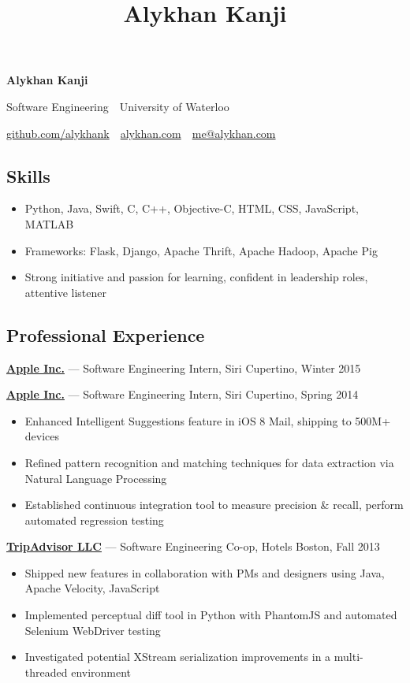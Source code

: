 \documentclass[11pt,letterpaper]{article}
\title{Alykhan Kanji}
\begin{document}
\begin{center}
  {\Huge \textbf{Alykhan Kanji}}

  {\large
    Software Engineering\ \textperiodcentered \ University of Waterloo

    \href{https://github.com/alykhank}{github.com/alykhank}\ \textperiodcentered \ \href{http://alykhan.com}{alykhan.com}\ \textperiodcentered \ \href{mailto:me@alykhan.com}{me@alykhan.com}
  }
\end{center}

\subsection*{Skills}

\begin{itemize}[before=,after=]
  \item Python, Java, Swift, C, C++, Objective-C, HTML, CSS, JavaScript, MATLAB
  \item Frameworks: Flask, Django, Apache Thrift, Apache Hadoop, Apache Pig
  \item Strong initiative and passion for learning, confident in leadership roles, attentive listener
\end{itemize}

\subsection*{Professional Experience}

\href{http://apple.com}{\textbf{Apple Inc.}} --- Software Engineering Intern, Siri \hfill {\color{gray} Cupertino, Winter 2015}
\vspace{6mm}

\href{http://apple.com}{\textbf{Apple Inc.}} --- Software Engineering Intern, Siri \hfill {\color{gray} Cupertino, Spring 2014}
\begin{itemize}
  \item Enhanced Intelligent Suggestions feature in iOS 8 Mail, shipping to 500M+ devices
  \item Refined pattern recognition and matching techniques for data extraction via Natural Language Processing
  \item Established continuous integration tool to measure precision \& recall, perform automated regression testing
\end{itemize}

\href{http://tripadvisor.com}{\textbf{TripAdvisor LLC}} --- Software Engineering Co-op, Hotels \hfill {\color{gray} Boston, Fall 2013}
\begin{itemize}
  \item Shipped new features in collaboration with PMs and designers using Java, Apache Velocity, JavaScript
  \item Implemented perceptual diff tool in Python with PhantomJS and automated Selenium WebDriver testing
  \item Investigated potential XStream serialization improvements in a multi-threaded environment
\end{itemize}
\end{document}
